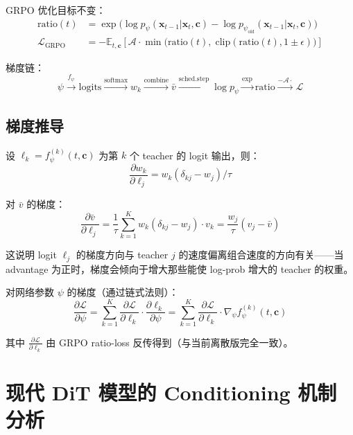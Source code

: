 \documentclass[11pt,a4paper]{article}
\newcommand{\loss}{\mathcal{L}}
\newcommand{\E}{\mathbb{E}}
\newcommand{\softmax}{\mathrm{softmax}}
\newcommand{\adv}{\mathcal{A}}
\theoremstyle{definition}
\begin{document}
GRPO 优化目标不变：
\begin{align}
\text{ratio}(t) &= \exp\bigl(\log p_\psi(\mathbf{x}_{t-1} | \mathbf{x}_t, \mathbf{c}) - \log p_{\psi_{\text{old}}}(\mathbf{x}_{t-1} | \mathbf{x}_t, \mathbf{c})\bigr) \\
\loss_{\text{GRPO}} &= -\E_{t, \mathbf{c}} \left[ \adv \cdot \min\bigl(\text{ratio}(t),\; \text{clip}(\text{ratio}(t), 1\pm\epsilon)\bigr) \right]
\end{align}

梯度链：
\[
\psi \xrightarrow{f_\psi} \text{logits} \xrightarrow{\softmax} w_k \xrightarrow{\text{combine}} \bar{v} \xrightarrow{\text{sched.step}} \log p_\psi \xrightarrow{\exp} \text{ratio} \xrightarrow{-\adv \cdot} \loss
\]

\subsection{梯度推导}

设 $\ell_k = f_\psi^{(k)}(t, \mathbf{c})$ 为第 $k$ 个 teacher 的 logit 输出，则：
\begin{equation}
\frac{\partial w_k}{\partial \ell_j} = w_k(\delta_{kj} - w_j) / \tau
\end{equation}

对 $\bar{v}$ 的梯度：
\begin{equation}
\frac{\partial \bar{v}}{\partial \ell_j} = \frac{1}{\tau} \sum_{k=1}^K w_k(\delta_{kj} - w_j) \cdot v_k
= \frac{w_j}{\tau} \left( v_j - \bar{v} \right)
\end{equation}

这说明 logit $\ell_j$ 的梯度方向与 teacher $j$ 的速度偏离组合速度的方向有关——当 advantage 为正时，梯度会倾向于增大那些能使 log-prob 增大的 teacher 的权重。

对网络参数 $\psi$ 的梯度（通过链式法则）：
\begin{equation}
\frac{\partial \loss}{\partial \psi} = \sum_{k=1}^K \frac{\partial \loss}{\partial \ell_k} \cdot \frac{\partial \ell_k}{\partial \psi}
= \sum_{k=1}^K \frac{\partial \loss}{\partial \ell_k} \cdot \nabla_\psi f_\psi^{(k)}(t, \mathbf{c})
\end{equation}

其中 $\frac{\partial \loss}{\partial \ell_k}$ 由 GRPO ratio-loss 反传得到（与当前离散版完全一致）。

\section{现代 DiT 模型的 Conditioning 机制分析}
\end{document}
